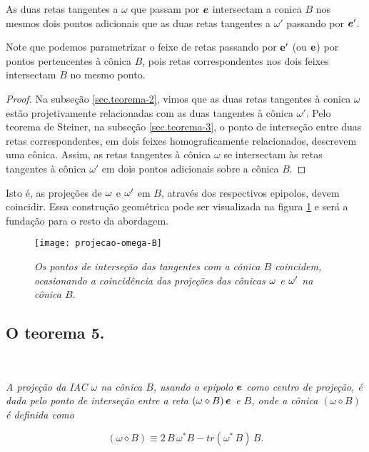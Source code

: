 \begin{teorema}
As duas retas tangentes a $\omega$ que passam por $\boldsymbol{e}$ intersectam a conica $B$ nos mesmos dois pontos adicionais que as duas retas tangentes a $\omega'$ passando por $\boldsymbol{e}'$.
\end{teorema}

Note que podemos parametrizar o feixe de retas passando por ${\bf e'}$ (ou ${\bf e}$) por pontos pertencentes à cônica $B$, pois retas correspondentes nos dois feixes intersectam $B$ no mesmo ponto. 

\begin{proof}
Na subseção \ref{sec.teorema-2}, vimos que as duas retas tangentes à conica $\omega$ estão projetivamente relacionadas com as duas tangentes à cônica $\omega'$. Pelo teorema de Steiner, na subseção \ref{sec.teorema-3}, o ponto de interseção entre duas retas correspondentes, em dois feixes homograficamente relacionados, descrevem uma cônica. Assim, as retas tangentes à cônica $\omega$ se intersectam às retas tangentes à cônica $\omega'$ em dois pontos adicionais sobre a cônica $B$. 
\end{proof}

Isto é, as projeções de ${\bf \omega}$ e ${\bf \omega'}$ em $B$, através dos respectivos epipolos, devem coincidir. Essa construção geométrica pode ser visualizada na figura \ref{omega-B} e será a fundação para o resto da abordagem. 

\begin{figure}[!htb]
\centering
\texttt{[image: projecao-omega-B]}
\caption{\textit{Os pontos de interseção das tangentes com a cônica $B$ coincidem, ocasionando a coincidência das projeções das cônicas ${\bf \omega}$ e ${\bf \omega'}$ na cônica $B$.}}
\label{omega-B}
\end{figure}

\subsection{O teorema 5.}\label{sec.teorema-5}

\,\,\,\,{\it A projeção da IAC $\omega$ na cônica $B$, usando o epipolo $\boldsymbol{e}$ como centro de projeção, é dada pelo ponto de interseção entre a reta $(\omega\diamond B)\,\boldsymbol{e}$ e $B$, onde a cônica $(\omega\diamond B)$ é definida como

\begin{equation}\label{eq.conica-diamond}
(\omega \diamond B)\equiv 2\,B\,\omega^*B - tr(\omega^*\,B)\,B.
\end{equation}
}



